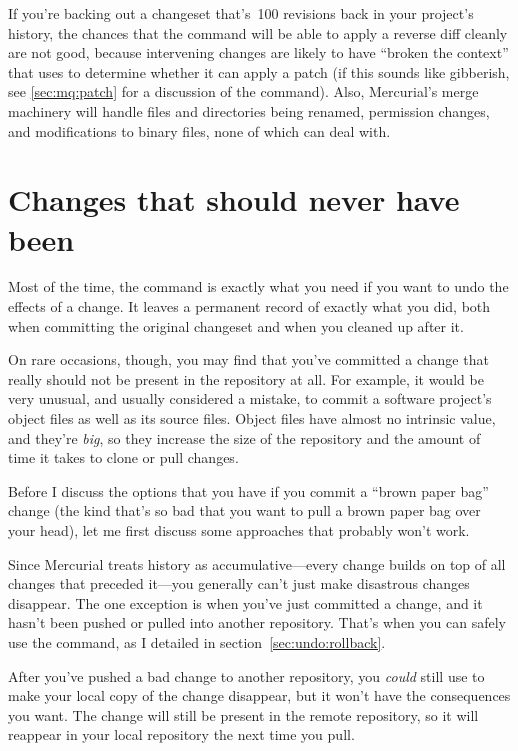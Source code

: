 If you're backing out a changeset that's~100 revisions back in your
project's history, the chances that the  command will
be able to apply a reverse diff cleanly are not good, because
intervening changes are likely to have ``broken the context'' that
 uses to determine whether it can apply a patch (if
this sounds like gibberish, see \ref{sec:mq:patch} for a
discussion of the  command).  Also, Mercurial's merge
machinery will handle files and directories being renamed, permission
changes, and modifications to binary files, none of which
 can deal with.

\section{Changes that should never have been}
\label{sec:undo:aaaiiieee}

Most of the time, the  command is exactly what you need
if you want to undo the effects of a change.  It leaves a permanent
record of exactly what you did, both when committing the original
changeset and when you cleaned up after it.

On rare occasions, though, you may find that you've committed a change
that really should not be present in the repository at all.  For
example, it would be very unusual, and usually considered a mistake,
to commit a software project's object files as well as its source
files.  Object files have almost no intrinsic value, and they're
\emph{big}, so they increase the size of the repository and the amount
of time it takes to clone or pull changes.

Before I discuss the options that you have if you commit a ``brown
paper bag'' change (the kind that's so bad that you want to pull a
brown paper bag over your head), let me first discuss some approaches
that probably won't work.

Since Mercurial treats history as accumulative---every change builds
on top of all changes that preceded it---you generally can't just make
disastrous changes disappear.  The one exception is when you've just
committed a change, and it hasn't been pushed or pulled into another
repository.  That's when you can safely use the 
command, as I detailed in section~\ref{sec:undo:rollback}.

After you've pushed a bad change to another repository, you
\emph{could} still use  to make your local copy of the
change disappear, but it won't have the consequences you want.  The
change will still be present in the remote repository, so it will
reappear in your local repository the next time you pull.

